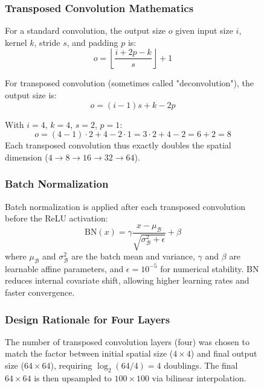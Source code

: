 \documentclass[12pt,a4paper,oneside]{report}
\begin{document}
\begin{figure}[H]
\subsubsection{Transposed Convolution Mathematics}

For a standard convolution, the output size $o$ given input size $i$, kernel $k$, stride $s$, and padding $p$ is:
\begin{equation}
o = \left\lfloor \frac{i + 2p - k}{s} \right\rfloor + 1
\end{equation}

For transposed convolution (sometimes called "deconvolution"), the output size is:
\begin{equation}
o = (i - 1)s + k - 2p
\end{equation}

With $i=4$, $k=4$, $s=2$, $p=1$:
\begin{equation}
o = (4 - 1)\cdot 2 + 4 - 2\cdot 1 = 3\cdot 2 + 4 - 2 = 6 + 2 = 8
\end{equation}
Each transposed convolution thus exactly doubles the spatial dimension ($4 \rightarrow 8 \rightarrow 16 \rightarrow 32 \rightarrow 64$).

\subsubsection{Batch Normalization}

Batch normalization is applied after each transposed convolution before the ReLU activation:
\begin{equation}
\text{BN}(x) = \gamma \frac{x - \mu_{\mathcal{B}}}{\sqrt{\sigma_{\mathcal{B}}^2 + \epsilon}} + \beta
\end{equation}
where $\mu_{\mathcal{B}}$ and $\sigma_{\mathcal{B}}^2$ are the batch mean and variance, $\gamma$ and $\beta$ are learnable affine parameters, and $\epsilon = 10^{-5}$ for numerical stability. BN reduces internal covariate shift, allowing higher learning rates and faster convergence.

\subsubsection{Design Rationale for Four Layers}

The number of transposed convolution layers (four) was chosen to match the factor between initial spatial size ($4 \times 4$) and final output size ($64 \times 64$), requiring $\log_2(64/4) = 4$ doublings. The final $64 \times 64$ is then upsampled to $100 \times 100$ via bilinear interpolation.


\end{figure}
\end{document}
